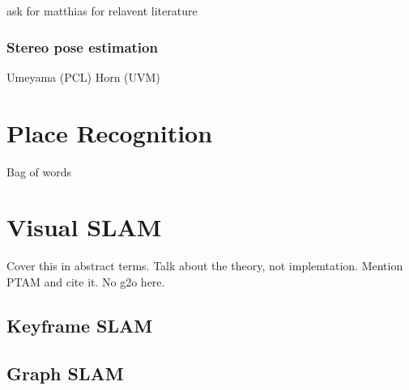 ask for matthias for relavent literature

\subsubsection{Stereo pose estimation}

Umeyama (PCL) \newline 
Horn (UVM)


\section{Place Recognition}

Bag of words

\section{Visual SLAM}

Cover this in abstract terms.  Talk about the theory, not implemtation.  Mention
PTAM and cite it.
No g2o here.

\subsection{Keyframe SLAM}

\subsection{Graph SLAM}
